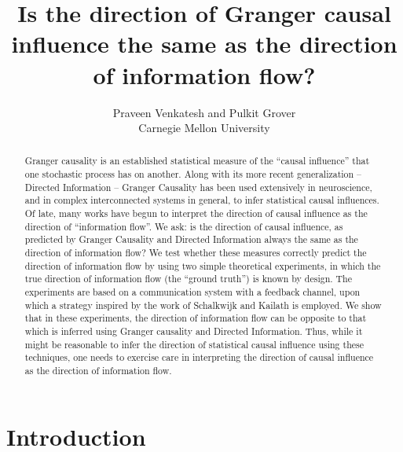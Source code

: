 \documentclass[letterpaper, 10pt, conference]{ieeeconf}
\begin{document}
\title{Is the direction of Granger causal influence the same as the direction of information flow?}
\author{Praveen Venkatesh and Pulkit Grover\\Carnegie Mellon University}

\maketitle


\begin{abstract}
	Granger causality is an established statistical measure of the ``causal influence'' that one stochastic process has on another. Along with its more recent generalization -- Directed Information -- Granger Causality has been used extensively in neuroscience, and in complex interconnected systems in general, to infer statistical causal influences. Of late, many works have begun to interpret the direction of causal influence as the direction of ``information flow''. We ask: is the direction of causal influence, as predicted by Granger Causality and Directed Information always the same as the direction of information flow? We test whether these measures correctly predict the direction of information flow by using two simple theoretical experiments, in which the true direction of information flow (the ``ground truth'') is known by design. The experiments are based on a communication system with a feedback channel, upon which a strategy inspired by the work of Schalkwijk and Kailath is employed. We show that in these experiments, the direction of information flow can be opposite to that which is inferred using Granger causality and Directed Information. Thus, while it might be reasonable to infer the direction of statistical causal influence using these techniques, one needs to exercise care in interpreting the direction of causal influence as the direction of information flow.
\end{abstract}

\IEEEpeerreviewmaketitle


\section{Introduction}
\label{sec:intro}

\end{document}
